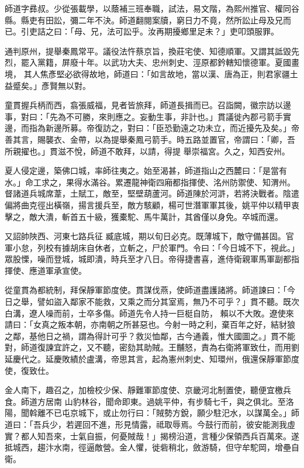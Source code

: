 \begin{pinyinscope}
 師道字彞叔。少從張載學，以蔭補三班奉職，試法，易文階，為熙州推官、權同谷縣。縣吏有田訟，彌二年不決。師道翻閱案牘，窮日力不竟，然所訟止母及兄而已。引吏詰之曰：「母、兄，法可訟乎。汝再期擾鄉里足未？」吏叩頭服罪。



 通判原州，提舉秦鳳常平。議役法忤蔡京旨，換莊宅使、知德順軍。又謂其詆毀先烈，罷入黨籍，屏廢十年。以武功大夫、忠州刺史、涇原都鈐轄知懷德軍。夏國畫境，
 其人焦彥堅必欲得故地，師道曰：「如言故地，當以漢、唐為正，則君家疆土益蹙矣。」彥賢無以對。



 童貫握兵柄而西，翕張威福，見者皆旅拜，師道長揖而已。召詣闕，徽宗訪以邊事，對曰：「先為不可勝，來則應之。妄動生事，非計也。」貫議徙內郡弓箭手實邊，而指為新邊所募。帝復訪之，對曰：「臣恐勤遠之功未立，而近擾先及矣。」帝善其言，賜襲衣、金帶，以為提舉秦鳳弓箭手。時五路並置官，帝謂曰：「卿，吾所親擢也。」貫滋不悅，師道不敢拜，以請，得提
 舉崇福宮。久之，知西安州。



 夏人侵定邊，築佛口城，率師往夷之。始至渴甚，師道指山之西麓曰：「是當有水。」命工求之，果得水滿谷。累遷龍神衛四廂都指揮使、洺州防禦使、知渭州。督諸道兵城席葦，土賦工，敵至，堅壁葫蘆河。師道陳於河滸，若將決戰者。陰遣偏將曲克徑出橫嶺，揚言援兵至，敵方駭顧，楊可世潛軍軍其後，姚平仲以精甲衷擊之，敵大潰，斬首五十級，獲橐駝、馬牛萬計，其酋僅以身免。卒城而還。



 又詔帥陜西、河東七路兵征
 臧底城，期以旬日必克。既薄城下，敵守備甚固。官軍小怠，列校有據胡床自休者，立斬之，尸於軍門。令曰：「今日城不下，視此。」眾股慄，噪而登城，城即潰，時兵至才八日。帝得捷書喜，進侍衛親軍馬軍副都指揮使、應道軍承宣使。



 從童貫為都統制，拜保靜軍節度使。貫謀伐燕，使師道盡護諸將。師道諫曰：「今日之舉，譬如盜入鄰家不能救，又乘之而分其室焉，無乃不可乎？」貫不聽。既次白溝，遼人噪而前，士卒多傷。師道先令人持一巨梃自防，
 賴以不大敗。遼使來請曰：「女真之叛本朝，亦南朝之所甚惡也。今射一時之利，棄百年之好，結豺狼之鄰，基他日之禍，謂為得計可乎？救災恤鄰，古今通義，惟大國圖之。」貫不能對，師道復諫宜許之，又不聽，密劾其助賊。王黼怒，責為右衛將軍致仕，而用劉延慶代之。延慶敗績於盧溝，帝思其言，起為憲州刺史、知環州，俄還保靜軍節度使，復致仕。



 金人南下，趣召之，加檢校少保、靜難軍節度使、京畿河北制置使，聽便宜檄兵食。師道方居南
 山豹林谷，聞命即東。過姚平仲，有步騎七千，與之俱北。至洛陽，聞斡離不已屯京城下，或止勿行曰：「賊勢方銳，願少駐汜水，以謀萬全。」師道曰：「吾兵少，若遲回不進，形見情露，祗取辱焉。今鼓行而前，彼安能測我虛實？都人知吾來，士氣自振，何憂賊哉！」揭榜沿道，言種少保領西兵百萬來。遂抵城西，趨汴水南，徑逼敵營。金人懼，徙砦稍北，斂游騎，但守牟駝岡，增壘自衛。




\end{pinyinscope}
